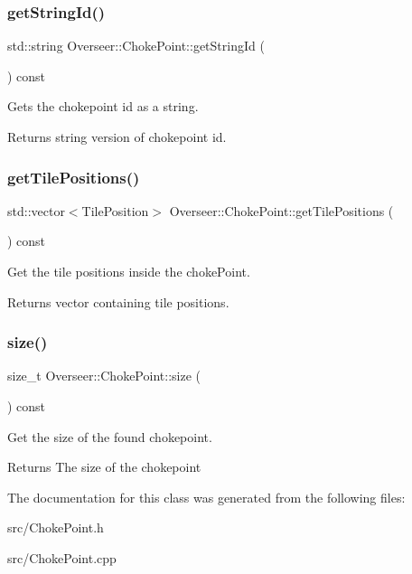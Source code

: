 \subsubsection{\texorpdfstring{get\+String\+Id()}{getStringId()}}
{\footnotesize\ttfamily std\+::string Overseer\+::\+Choke\+Point\+::get\+String\+Id (\begin{DoxyParamCaption}{ }\end{DoxyParamCaption}) const}



Gets the chokepoint id as a string. 

\begin{DoxyReturn}{Returns}
string version of chokepoint id. 
\end{DoxyReturn}
\mbox{\label{classOverseer_1_1ChokePoint_adabe2718639f0ec4230719ba44474d1e}} 
\subsubsection{\texorpdfstring{get\+Tile\+Positions()}{getTilePositions()}}
{\footnotesize\ttfamily std\+::vector$<$Tile\+Position$>$ Overseer\+::\+Choke\+Point\+::get\+Tile\+Positions (\begin{DoxyParamCaption}{ }\end{DoxyParamCaption}) const}



Get the tile positions inside the choke\+Point. 

\begin{DoxyReturn}{Returns}
vector containing tile positions. 
\end{DoxyReturn}
\mbox{\label{classOverseer_1_1ChokePoint_a33391bda0a2a84efb0114dce77d836ff}} 
\subsubsection{\texorpdfstring{size()}{size()}}
{\footnotesize\ttfamily size\+\_\+t Overseer\+::\+Choke\+Point\+::size (\begin{DoxyParamCaption}{ }\end{DoxyParamCaption}) const}



Get the size of the found chokepoint. 

\begin{DoxyReturn}{Returns}
The size of the chokepoint 
\end{DoxyReturn}


The documentation for this class was generated from the following files\+:\begin{DoxyCompactItemize}
\item 
src/Choke\+Point.\+h\item 
src/Choke\+Point.\+cpp\end{DoxyCompactItemize}
